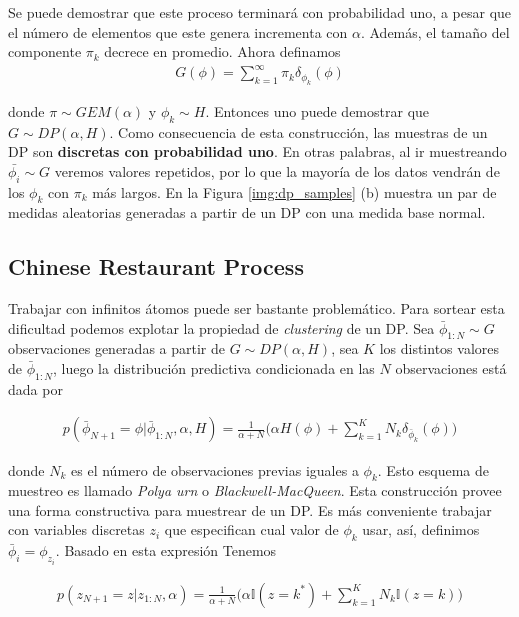 \documentclass[letterpaper,12pt,oneside]{book} %
\begin{document}
Se puede demostrar que este proceso terminará con probabilidad uno, a pesar que el número de elementos que este genera incrementa con $\alpha$. Además, el tamaño del componente $\pi_{k}$ decrece en promedio. Ahora definamos 
\begin{align}
    G(\phi) = \sum_{k=1}^{\infty}\pi_{k}\delta_{\phi_{k}}(\phi)
\end{align}

donde $\pi \sim GEM(\alpha)$ y $\phi_{k} \sim H$. Entonces uno puede demostrar que $G \sim DP(\alpha, H)$. Como consecuencia de esta construcción, las muestras de un DP son \textbf{discretas con probabilidad uno}. En otras palabras, al ir muestreando $\bar{\phi_{i}}\sim G$ veremos valores repetidos, por lo que la mayoría de los datos vendrán de los $\phi_{k}$ con $\pi_{k}$ más largos. En la Figura \ref{img:dp_samples} (b) muestra un par de medidas aleatorias generadas a partir de un DP con una medida base normal.\\


\subsection{Chinese Restaurant Process}
\label{sec:crp}

Trabajar con infinitos átomos puede ser bastante problemático. Para sortear esta dificultad podemos explotar la propiedad de \textit{clustering} de un DP. Sea $\bar{\phi}_{1:N}\sim G$ observaciones generadas a partir de $G\sim DP(\alpha, H)$, sea $K$ los distintos valores de $\bar{\phi}_{1:N}$, luego la distribución predictiva condicionada en las $N$ observaciones está dada por

\begin{align}
p(\bar{\phi}_{N+1}=\phi|\bar{\phi}_{1:N}, \alpha, H) = \frac{1}{\alpha+N}\bigg(\alpha H(\phi)+\sum_{k=1}^{K}N_{k}\delta_{\bar{\phi}_{k}}(\phi)\bigg)
\end{align}

donde $N_{k}$ es el número de observaciones previas iguales a $\phi_{k}$. Esto esquema de muestreo es llamado \textit{Polya urn} o \textit{Blackwell-MacQueen}. Esta construcción provee una forma constructiva para muestrear de un DP. Es más conveniente trabajar con variables discretas $z_{i}$ que especifican cual valor de $\phi_{k}$ usar, así, definimos $\bar{\phi}_{i}=\phi_{z_{i}}$. Basado en esta expresión Tenemos

\begin{align}
p(z_{N+1}=z|z_{1:N}, \alpha) = \frac{1}{\alpha+N}\bigg(\alpha\mathbb{I}(z=k^{*})+\sum_{k=1}^{K}N_{k}\mathbb{I}(z=k)\bigg)
\end{align}
\end{document}
